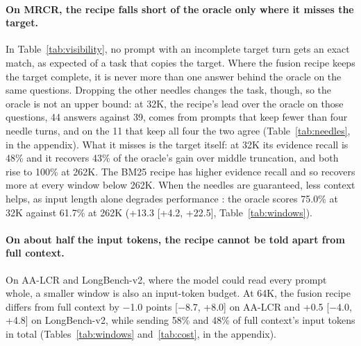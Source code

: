 \documentclass[letterpaper]{article} %
\newcommand{\recipe}{fusion recipe}
\begin{document}
\paragraph{On MRCR, the recipe falls short of the oracle only where it misses the target.} In Table~\ref{tab:visibility}, no prompt with an incomplete target turn gets an exact match, as expected of a task that copies the target. Where the \recipe{} keeps the target complete, it is never more than one answer behind the oracle on the same questions. Dropping the other needles changes the task, though, so the oracle is not an upper bound: at 32K, the recipe's lead over the oracle on those questions, 44 answers against 39, comes from prompts that keep fewer than four needle turns, and on the 11 that keep all four the two agree (Table~\ref{tab:needles}, in the appendix). What it misses is the target itself: at 32K its evidence recall is 48\% and it recovers 43\% of the oracle's gain over middle truncation, and both rise to 100\% at 262K. The BM25 recipe has higher evidence recall and so recovers more at every window below 262K. When the needles are guaranteed, less context helps, as input length alone degrades performance \cite{levy2024same,gao2026ink}: the oracle scores 75.0\% at 32K against 61.7\% at 262K (+13.3 [+4.2, +22.5], Table~\ref{tab:windows}).

\paragraph{On about half the input tokens, the recipe cannot be told apart from full context.} On AA-LCR and LongBench-v2, where the model could read every prompt whole, a smaller window is also an input-token budget. At 64K, the \recipe{} differs from full context by $-$1.0 points [$-$8.7, +8.0] on AA-LCR and +0.5 [$-$4.0, +4.8] on LongBench-v2, while sending 58\% and 48\% of full context's input tokens in total (Tables~\ref{tab:windows} and~\ref{tab:cost}, in the appendix).
\end{document}
